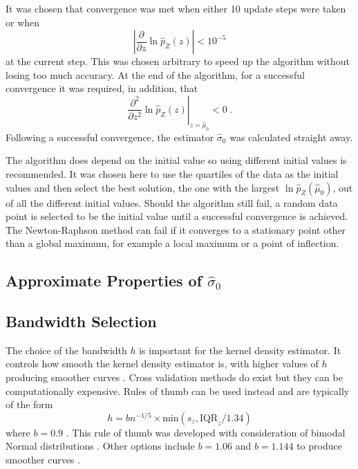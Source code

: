 It was chosen that convergence was met when either 10 update steps were taken or when
\begin{equation}
  \left|
    \dfrac{
      \partial
    }
    {
      \partial z
    }
  \ln\widehat{p}_Z(z)
  \right|
  <10^{-5}
\end{equation}
at the current step. This was chosen arbitrary to speed up the algorithm without losing too much accuracy. At the end of the algorithm, for a successful convergence it was required, in addition, that
\begin{equation}
  \left.
    \dfrac{
      \partial^2
    }
    {
      \partial z^2
    }
    \ln\widehat{p}_Z(z)
  \right|_{z=\widehat{\mu}_0}
  < 0 \ .
\end{equation}
Following a successful convergence, the estimator $\widehat{\sigma}_0$ was calculated straight away.

The algorithm does depend on the initial value so using different initial values is recommended. It was chosen here to use the quartiles of the data as the initial values and then select the best solution, the one with the largest $\ln\widehat{p}_Z\left(\widehat{\mu}_0\right)$, out of all the different initial values. Should the algorithm still fail, a random data point is selected to be the initial value until a successful convergence is achieved. The Newton-Raphson method can fail if it converges to a stationary point other than a global maximum, for example a local maximum or a point of inflection. 

\subsection{Approximate Properties of $\widehat{\sigma}_0$}

\subsection{Bandwidth Selection}

The choice of the bandwidth $h$ is important for the kernel density estimator. It controls how smooth the kernel density estimator is, with higher values of $h$ producing smoother curves \citep{friedman2001elements}. Cross validation methods do exist \citep{bowman1984alternative, sheather2004density} but they can be computationally expensive. Rules of thumb \citep{silverman1986density, sheather2004density} can be used instead and are typically of the form
\begin{equation}
  h = bn^{-1/5}\times\text{min}\left(s_z,\text{IQR}_z/1.34\right)
\end{equation}
where $b=0.9$ \citep{silverman1986density}. This rule of thumb was developed with consideration of bimodal Normal distributions \citep{silverman1986density}. Other options include $b=1.06$ and $b=1.144$ to produce smoother curves \citep{silverman1986density, sheather2004density}.

